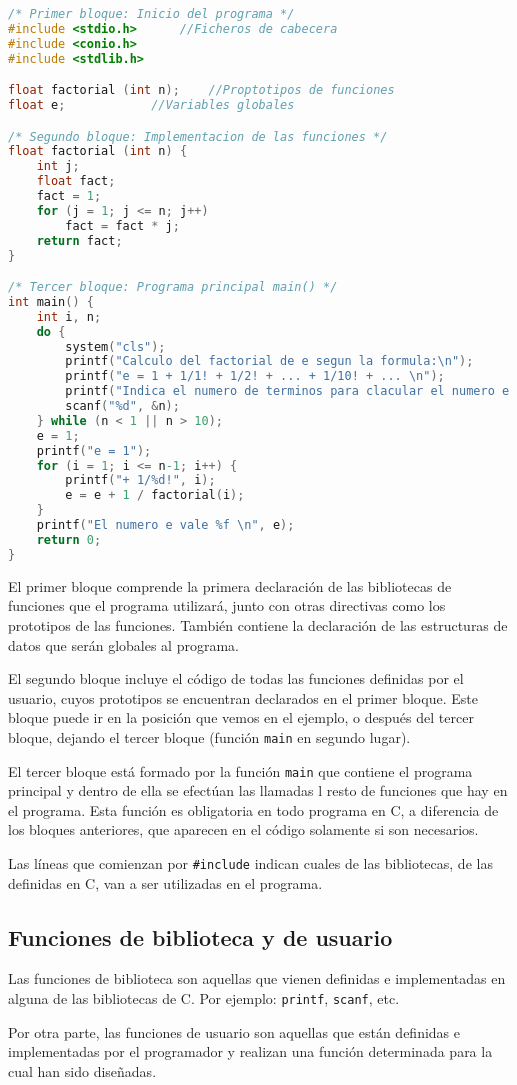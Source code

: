 \begin{Ejemplo}
\begin{lstlisting}[language=C]
/* Primer bloque: Inicio del programa */
#include <stdio.h>		//Ficheros de cabecera
#include <conio.h>
#include <stdlib.h>

float factorial (int n);	//Proptotipos de funciones
float e;			//Variables globales

/* Segundo bloque: Implementacion de las funciones */
float factorial (int n) {
    int j;
    float fact;
    fact = 1;
    for (j = 1; j <= n; j++)
        fact = fact * j;
    return fact;
}

/* Tercer bloque: Programa principal main() */
int main() {
    int i, n;
    do {
        system("cls");
        printf("Calculo del factorial de e segun la formula:\n");
        printf("e = 1 + 1/1! + 1/2! + ... + 1/10! + ... \n");
        printf("Indica el numero de terminos para clacular el numero e (max 10): ");
        scanf("%d", &n);
    } while (n < 1 || n > 10);
    e = 1;
    printf("e = 1");
    for (i = 1; i <= n-1; i++) {
        printf("+ 1/%d!", i);
        e = e + 1 / factorial(i);
    }
    printf("El numero e vale %f \n", e);
    return 0;
}
\end{lstlisting}
\Explicacion
El primer bloque comprende la primera declaración de las bibliotecas de funciones que el programa utilizará, junto con otras directivas como los prototipos de las funciones. También contiene la declaración de las estructuras de datos que serán globales al programa.

El segundo bloque incluye el código de todas las funciones definidas por el usuario, cuyos prototipos se encuentran declarados en el primer bloque. Este bloque puede ir en la posición que vemos en el ejemplo, o después del tercer bloque, dejando el tercer bloque (función \texttt{main} en segundo lugar).

El tercer bloque está formado por la función \texttt{main} que contiene el programa principal y dentro de ella se efectúan las llamadas l resto de funciones que hay en el programa. Esta función es obligatoria en todo programa en C, a diferencia de los bloques anteriores, que aparecen en el código solamente si son necesarios.

Las líneas que comienzan por \texttt{\#include} indican cuales de las bibliotecas, de las definidas en C, van a ser utilizadas en el programa.
\end{Ejemplo}

\subsection{Funciones de biblioteca y de usuario}{
Las funciones de biblioteca son aquellas que vienen definidas e implementadas en alguna de las bibliotecas de C. Por ejemplo: \texttt{printf}, \texttt{scanf}, etc.

Por otra parte, las funciones de usuario son aquellas que están definidas e implementadas por el programador y realizan una función determinada para la cual han sido diseñadas.
}
